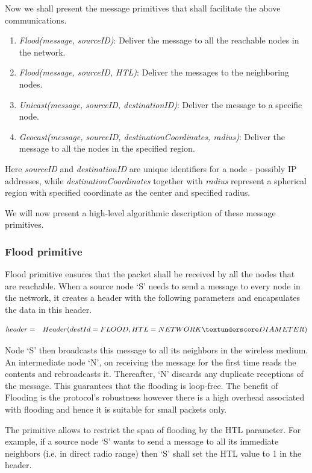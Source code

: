 Now we shall present the message primitives that shall facilitate the above communications. 
\begin{enumerate}
\item \emph{Flood(message, sourceID)}: Deliver  the message to all the reachable nodes in the network.
\item \emph{Flood(message, sourceID, HTL)}: Deliver the messages to the neighboring nodes.
\item \emph{Unicast(message, sourceID, destinationID)}: Deliver the message to a specific node.
\item \emph{Geocast(message, sourceID, destinationCoordinates, radius)}: Deliver the message to all the nodes in the specified region.
\end{enumerate}

Here \emph{sourceID} and \emph{destinationID} are unique identifiers for a node - possibly IP addresses, while \emph{destinationCoordinates} together with \emph{radius} represent a spherical region with specified coordinate as the center and specified radius.

We will now present a high-level algorithmic description of these message primitives.

\subsubsection{Flood primitive}

Flood primitive ensures that the packet shall be received by all the nodes that are reachable. When a source node `S' needs to send a message to every node in the network, it creates a header with the following parameters and encapsulates the data in this header.

\begin{eqnarray*}
& header = &Header(destId = FLOOD, HTL = NETWORK\textunderscore DIAMETER)
\end{eqnarray*} 

Node `S' then broadcasts this message to all its neighbors in the wireless medium. An intermediate node `N', on receiving the message for the first time reads the contents and rebroadcasts it. Thereafter, `N' discards any duplicate receptions of the message. This guarantees that the flooding is loop-free. The benefit of Flooding is the protocol's robustness however there is a high overhead associated with flooding and hence it is suitable for small packets only.

The primitive allows to restrict the span of flooding by the HTL parameter. For example, if a source node `S' wants to send a message to all its immediate neighbors (i.e. in direct radio range) then `S' shall set the HTL value to 1 in the header.

